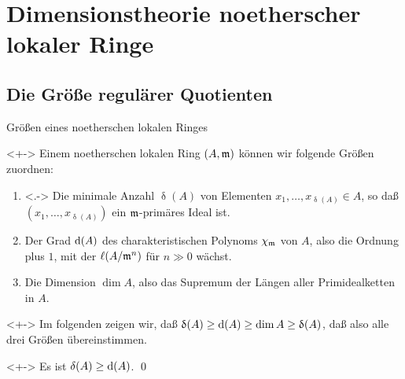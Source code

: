 \section{Dimensionstheorie noetherscher lokaler Ringe}

\subsection{Die Größe regulärer Quotienten}

\begin{frame}{Größen eines noetherschen lokalen Ringes}
	\begin{visibleenv}<+->
		Einem noetherschen lokalen Ring \((A, \mathfrak{m})\) können wir folgende Größen zuordnen:
		\begin{enumerate}[<+->]
		\item<.->
			Die minimale Anzahl \(\updelta(A)\) von Elementen \(x_1, \dotsc, x_{\updelta(A)} \in A\), so daß
			\((x_1, \dotsc, x_{\updelta(A)})\) ein \(\mathfrak{m}\)-primäres Ideal ist.
		\item
			Der Grad \(\operatorname{d}(A)\) des charakteristischen Polynoms \(\chi_{\mathfrak{m}}\) von \(A\), also
			die Ordnung plus \(1\), mit der \(\ell(A/\mathfrak{m}^n)\) für
			\(n \gg 0\) wächst.
		\item
			Die Dimension \(\dim A\), also das Supremum der Längen aller Primidealketten in \(A\).
		\end{enumerate}
	\end{visibleenv}
	\begin{visibleenv}<+->
		Im folgenden zeigen wir, daß \(\updelta(A) \ge \operatorname{d}(A) \ge \dim A \ge \updelta(A)\), daß also alle drei Größen
		übereinstimmen.
	\end{visibleenv}
	\begin{proposition}<+->
		Es ist \(\delta(A) \ge \operatorname{d}(A)\).
		\qed
	\end{proposition}
\end{frame}

